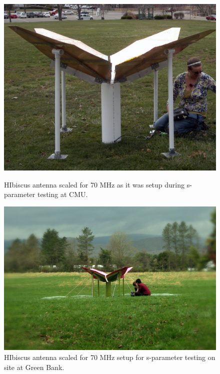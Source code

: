 \begin{figure}[htb]
\centering
\begin{minipage}[b]{0.43\textwidth}
\centering
\includegraphics[width=0.95\linewidth]{SCIHI_system/figures/HIbiscus_pgh_imp.jpg}
\caption{HIbiscus antenna scaled for 70 MHz as it was setup during s-parameter testing at CMU. }
\label{Fig:hibiscus_first}
\end{minipage}%
\begin{minipage}[b]{0.02\textwidth}
\hspace{1cm}
\end{minipage}%
\begin{minipage}[b]{0.51\textwidth}
\centering
\includegraphics[width=0.95\linewidth]{SCIHI_system/figures/HIbiscus_gbt.jpg}
\caption{HIbiscus antenna scaled for 70 MHz setup for s-parameter testing on site at Green Bank.}
\label{Fig:hibiscus_gbt}
\end{minipage}
\end{figure}

